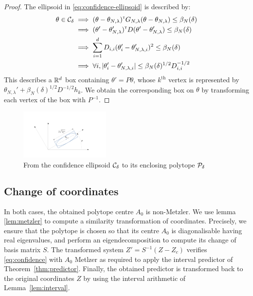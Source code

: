 \documentclass{article}
\begin{document}
\begin{proof}
The ellipsoid in \eqref{eq:confidence-ellipsoid} is described by:
\begin{align*}
    \theta\in\mathcal{C}_\delta &\implies
    (\theta-\theta_{N,\lambda})^{\mathsf{\scriptscriptstyle T}} G_{N,\lambda}(\theta-\theta_{N,\lambda}) \leq \beta_{N}(\delta)\\
    &\implies (\theta'-\theta'_{N,\lambda})^{\mathsf{\scriptscriptstyle T}} D (\theta'-\theta'_{N,\lambda}) \leq \beta_{N}(\delta)\\
    &\implies \sum_{i=1}^d D_{i,i}(\theta'_i-\theta'_{N,\lambda,i})^2\leq \beta_{N}(\delta)\\
    &\implies\forall i, |\theta'_i-\theta'_{N,\lambda,i}|\leq \beta_{N}(\delta)^{1/2}D_{i,i}^{-1/2}
\end{align*}
This describes a $\mathbb{R}^d$ box containing $\theta' = P\theta$, whose $k^\text{th}$ vertex is represented by $\theta_{N,\lambda}' + \beta_{N}(\delta)^{1/2}D^{-1/2} h_k$. We obtain the corresponding box on $\theta$ by transforming each vertex of the box with $P^{-1}$.
\end{proof}

\begin{figure}
    \centering
    \includegraphics[trim={3.8cm, 2cm, 5cm, 3.8cm}, clip, width=0.4\textwidth]{img/ellipsoid_to_polytope}
    \caption{From the confidence ellipsoid $\mathcal{C}_\delta$ to its enclosing polytope $\mathcal{P}_\delta$}
    \label{fig:ellipsoid_to_polytope}
\end{figure}

\subsection{Change of coordinates}
In both cases, the obtained polytope centre $A_0$ is non-Metzler.
We use lemma \ref{lem:metzler} to compute a similarity transformation of coordinates. Precisely, we ensure that the polytope is chosen so that its centre $A_0$ is diagonalisable having real eigenvalues, and perform an eigendecomposition to compute its change of basis matrix $S$. The transformed system $Z'=S^{-1}(Z-Z_c)$ verifies \eqref{eq:confidence} with $A_0$ Metlzer as required to apply the interval predictor of Theorem~\ref{thm:predictor}. Finally, the obtained predictor is transformed back to the original coordinates $Z$ by using the interval arithmetic of Lemma~\ref{lem:interval}.
\end{document}
